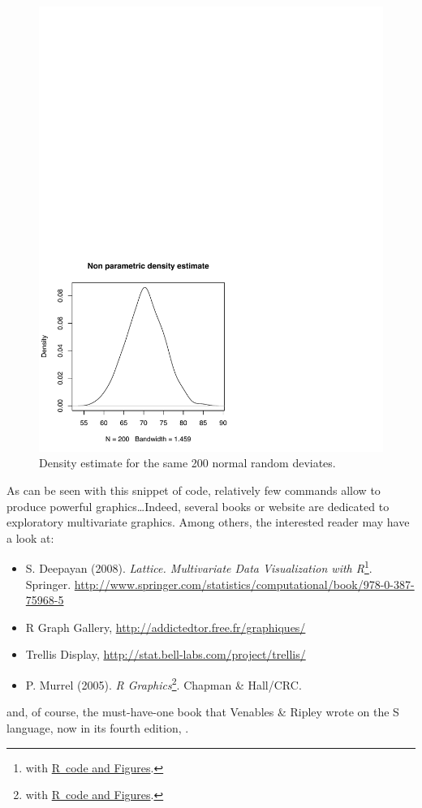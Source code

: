 \documentclass[11pt,a4paper]{memoir}\usepackage[]{graphicx}\usepackage[]{color}
\newcommand{\R}{\textsf{R}}
\begin{document}
\begin{figure}[htb]
\begin{minipage}[t]{.45\textwidth}
  \includegraphics[width=.95\textwidth]{./inputs/fig2.pdf}
  \caption{Density estimate for the same 200 normal random deviates.}
  \label{fig:2.2}
\end{minipage}
\end{figure}

As can be seen with this snippet of code, relatively few commands
allow to produce powerful graphics\ldots Indeed, several books or
website are dedicated to exploratory multivariate graphics. Among
others, the interested reader may have a look at:
\begin{itemize}
\item S. Deepayan (2008). \emph{Lattice. Multivariate Data
    Visualization with R}\footnote{with \href{http://dsarkar.fhcrc.org/lattice/book/figures.html}{\R\ code and
      Figures}.}. Springer.  
  \url{http://www.springer.com/statistics/computational/book/978-0-387-75968-5} 
\item R Graph Gallery, \url{http://addictedtor.free.fr/graphiques/}
\item Trellis Display, \url{http://stat.bell-labs.com/project/trellis/}
\item P. Murrel (2005). \emph{R Graphics}\footnote{with \href{http://www.stat.auckland.ac.nz/~paul/RGraphics/rgraphics.html}{\R\ code and
    Figures}.}. 
  Chapman \& Hall/CRC.
\end{itemize}
and, of course, the must-have-one book that Venables \& Ripley wrote
on the \textsf{S} language, now in its fourth edition,
\autocite{Venables:2002}.
\end{document}
